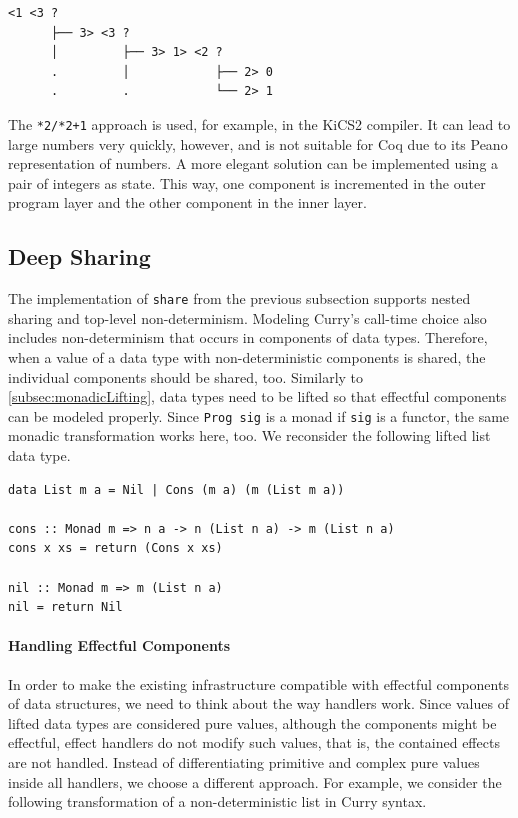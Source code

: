 \documentclass[a4paper, 11pt, fleqn, twoside, abstract=on]{scrreprt}
\newcommand{\hinl}[1]{\texttt{#1}}
\begin{document}
\begin{verbatim}
<1 <3 ? 
      ├── 3> <3 ? 
      │         ├── 3> 1> <2 ? 
      .         │            ├── 2> 0
      .         .            └── 2> 1

\end{verbatim}

The \hinl{*2/*2+1} approach is used, for example, in the KiCS2 compiler.
It can lead to large numbers very quickly, however, and is not suitable for Coq due to its Peano representation of numbers.
A more elegant solution can be implemented using a pair of integers as state.
This way, one component is incremented in the outer program layer and the other component in the inner layer.

\subsection{Deep Sharing}
\label{subsec:deepSharing}
The implementation of \hinl{share} from the previous subsection supports nested sharing and top-level non-determinism.
Modeling Curry's call-time choice also includes non-determinism that occurs in components of data types.
Therefore, when a value of a data type with non-deterministic components is shared, the individual components should be shared, too.
Similarly to \autoref{subsec:monadicLifting}, data types need to be lifted so that effectful components can be modeled properly.
Since \hinl{Prog sig} is a monad if \hinl{sig} is a functor, the same monadic transformation works here, too.
We reconsider the following lifted list data type.

\begin{verbatim}
data List m a = Nil | Cons (m a) (m (List m a))

cons :: Monad m => n a -> n (List n a) -> m (List n a)
cons x xs = return (Cons x xs)

nil :: Monad m => m (List n a)
nil = return Nil
\end{verbatim}

\paragraph{Handling Effectful Components}
In order to make the existing infrastructure compatible with effectful components of data structures, we need to think about the way handlers work.
Since values of lifted data types are considered pure values, although the components might be effectful, effect handlers do not modify such values, that is, the contained effects are not handled.
Instead of differentiating primitive and complex pure values inside all handlers, we choose a different approach.
For example, we consider the following transformation of a non-deterministic list in Curry syntax.
\end{document}
